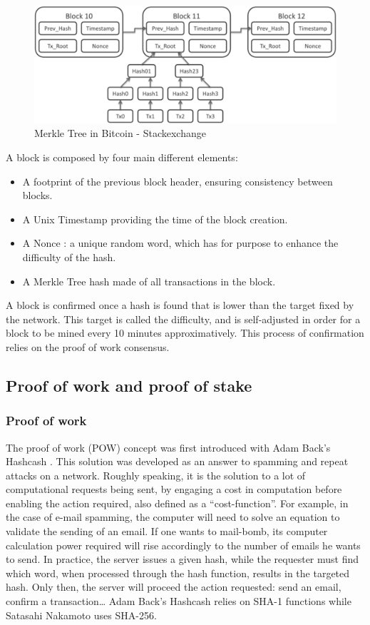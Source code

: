 \documentclass[11pt]{report}
\begin{document}
\medbreak
\begin{figure}[!h]
\centering
\includegraphics{Chap1/Block}
\caption{Merkle Tree in Bitcoin - Stackexchange}
\label{Block}
\end{figure}
\medbreak

A block is composed by four main different elements:
\begin{itemize}
\item A footprint of the previous block header, ensuring consistency between blocks.
\item A Unix Timestamp providing the time of the block creation.
\item A Nonce : a unique random word, which has for purpose to enhance the difficulty of the hash.
\item A Merkle Tree hash made of all transactions in the block.
\end{itemize}

A block is confirmed once a hash is found that is lower than the target fixed by the network. This target is called the difficulty, and is self-adjusted in order for a block to be mined every 10 minutes approximatively. This process of confirmation relies on the proof of work consensus.
	\clearpage
	\subsection*{Proof of work and proof of stake}
	\subsubsection*{Proof of work}
The proof of work (POW) concept was first introduced with Adam Back’s Hashcash \cite{ADAM}. This solution was developed as an answer to spamming and repeat attacks on a network. Roughly speaking, it is the solution to a lot of computational requests being sent, by engaging a cost in computation before enabling the action required, also defined as a “cost-function”. For example, in the case of e-mail spamming, the computer will need to solve an equation to validate the sending of an email. If one wants to mail-bomb, its computer calculation power required will rise accordingly to the number of emails he wants to send.\newline
In practice, the server issues a given hash, while the requester must find which word, when processed through the hash function, results in the targeted hash. Only then, the server will proceed the action requested: send an email, confirm a transaction…\newline
Adam Back’s Hashcash relies on SHA-1 functions while Satasahi Nakamoto uses SHA-256.
\end{document}
